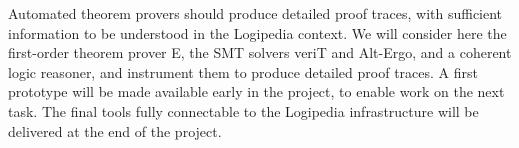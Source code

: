 \begin{workpackage}
\begin{tasklist}
\begin{task}[id=instrumenting,
      title=Instrumenting ATPs to produce traces,
      lead=Lie,
      LieRM=28,
      ImtRM=1,
      OcaRM=12,
      BelRM=6,
    ]
    Automated theorem provers should produce detailed proof traces, with
    sufficient information to be understood in the Logipedia context.  We will
    consider here the first-order theorem prover E, the SMT solvers
    veriT and Alt-Ergo, and a
    coherent logic reasoner, and instrument them to produce detailed proof
    traces.  A first prototype will be made available early in the project, to
    enable work on the next task.  The final tools fully connectable to the
    Logipedia infrastructure will be delivered at the end of the project.








\end{task}


  \begin{task}[id=tracetodedukti,
      title=Translate ATP traces into Dedukti,
      lead=Imt,
      LieRM=12,
      ImtRM=8,
      SacRM=2,
    ]


\end{task}
\end{tasklist}
\end{workpackage}
